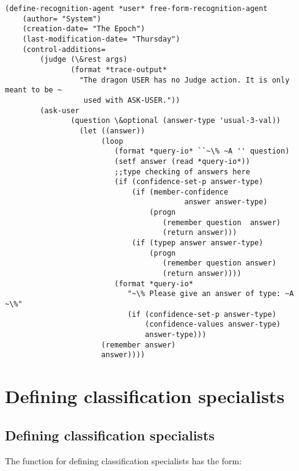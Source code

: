 \begin{verbatim}
(define-recognition-agent *user* free-form-recognition-agent
    (author= "System") 
    (creation-date= "The Epoch")
    (last-modification-date= "Thursday")
    (control-additions= 
        (judge (\&rest args)
               (format *trace-output*
                 "The dragon USER has no Judge action. It is only meant to be ~
                  used with ASK-USER."))
        (ask-user
               (question \&optional (answer-type 'usual-3-val))
                 (let ((answer))
                      (loop
                         (format *query-io* ``~\% ~A '' question)
                         (setf answer (read *query-io*))
                         ;;type checking of answers here
                         (if (confidence-set-p answer-type)
                             (if (member-confidence
                                         answer answer-type)
                                 (progn
                                    (remember question  answer)
                                    (return answer)))
                             (if (typep answer answer-type)
                                 (progn
                                    (remember question answer)
                                    (return answer))))
                         (format *query-io*
                            "~\% Please give an answer of type: ~A ~\%"
                            (if (confidence-set-p answer-type)
                                (confidence-values answer-type)
                                answer-type)))
                      (remember answer)
                      answer))))
\end{verbatim}





\chapter{Defining classification specialists}

\section{Defining classification specialists}

 The function for defining classification specialists has the
form:

